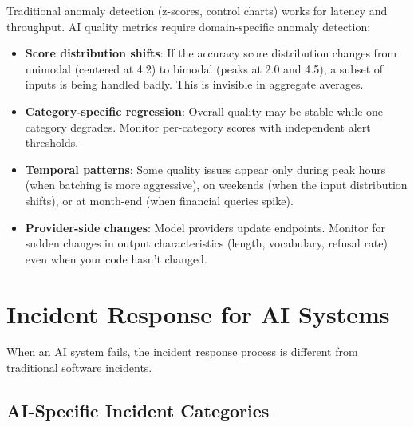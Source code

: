 Traditional anomaly detection (z-scores, control charts) works for latency and throughput. AI quality metrics require domain-specific anomaly detection:

\begin{itemize}[leftmargin=*]
    \item \textbf{Score distribution shifts}: If the accuracy score distribution changes from unimodal (centered at 4.2) to bimodal (peaks at 2.0 and 4.5), a subset of inputs is being handled badly. This is invisible in aggregate averages.
    \item \textbf{Category-specific regression}: Overall quality may be stable while one category degrades. Monitor per-category scores with independent alert thresholds.
    \item \textbf{Temporal patterns}: Some quality issues appear only during peak hours (when batching is more aggressive), on weekends (when the input distribution shifts), or at month-end (when financial queries spike).
    \item \textbf{Provider-side changes}: Model providers update endpoints. Monitor for sudden changes in output characteristics (length, vocabulary, refusal rate) even when your code hasn't changed.
\end{itemize}


\section{Incident Response for AI Systems}

When an AI system fails, the incident response process is different from traditional software incidents.

\subsection{AI-Specific Incident Categories}


